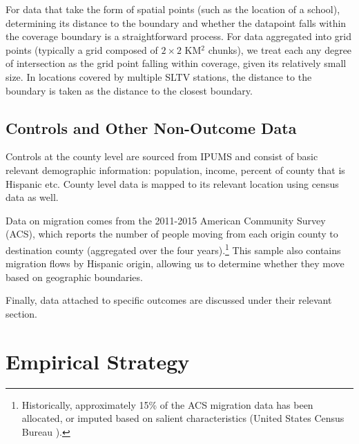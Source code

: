 \documentclass[11pt]{article}
\begin{document}
For data that take the form of spatial points (such as the location of a school), determining its distance to the boundary and whether the datapoint falls within the coverage boundary is a straightforward process.  For data aggregated into grid points (typically a grid composed of $2 \times 2$ KM$^2$ chunks), we treat each any degree of intersection as the grid point falling within coverage, given its relatively small size. In locations covered by multiple SLTV stations, the distance to the boundary is taken as the distance to the closest boundary. %

\subsection{Controls and Other Non-Outcome Data}
Controls at the county level are sourced from IPUMS and consist of basic relevant demographic information: population, income, percent of county that is Hispanic etc. County level data is mapped to its relevant location using census data as well. 

Data on migration comes from the 2011-2015 American Community Survey (ACS), which reports the number of people moving from each origin county to destination county (aggregated over the four years).\footnote{ Historically, approximately 15\% of the ACS migration data has been allocated, or imputed based on salient characteristics (United States Census Bureau \cite{noauthor_american_2020}). } This sample also contains migration flows by Hispanic origin, allowing us to determine whether they move based on geographic boundaries.

Finally, data attached to specific outcomes are discussed under their relevant section.


\section{Empirical Strategy}\label{secrd}
\end{document}
